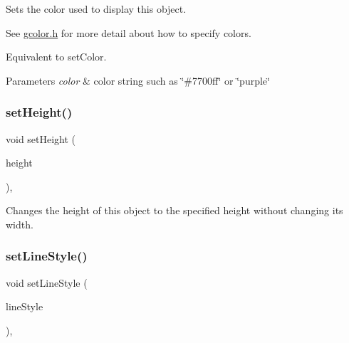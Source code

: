Sets the color used to display this object. 

See \mbox{\hyperlink{gcolor_8h_source}{gcolor.\+h}} for more detail about how to specify colors.

Equivalent to set\+Color.


\begin{DoxyParams}{Parameters}
{\em color} & color string such as \char`\"{}\#7700ff\char`\"{} or \char`\"{}purple\char`\"{} \\
\hline
\end{DoxyParams}
\mbox{\label{classsgl_1_1GObject_a9e280bfc4544dfaf8e4376c4e1a74357}} 
\subsubsection{\texorpdfstring{set\+Height()}{setHeight()}}
{\footnotesize\ttfamily void set\+Height (\begin{DoxyParamCaption}\item[{double}]{height }\end{DoxyParamCaption})\hspace{0.3cm}{\ttfamily [virtual]}, {\ttfamily [inherited]}}



Changes the height of this object to the specified height without changing its width. 

\mbox{\label{classsgl_1_1GObject_add11575087eb94f1a71faa3f826c6341}} 
\subsubsection{\texorpdfstring{set\+Line\+Style()}{setLineStyle()}}
{\footnotesize\ttfamily void set\+Line\+Style (\begin{DoxyParamCaption}\item[{\mbox{\hyperlink{classsgl_1_1GObject_a86e0f5648542856159bb40775c854aa7}{G\+Object\+::\+Line\+Style}}}]{line\+Style }\end{DoxyParamCaption})\hspace{0.3cm}{\ttfamily [virtual]}, {\ttfamily [inherited]}}



